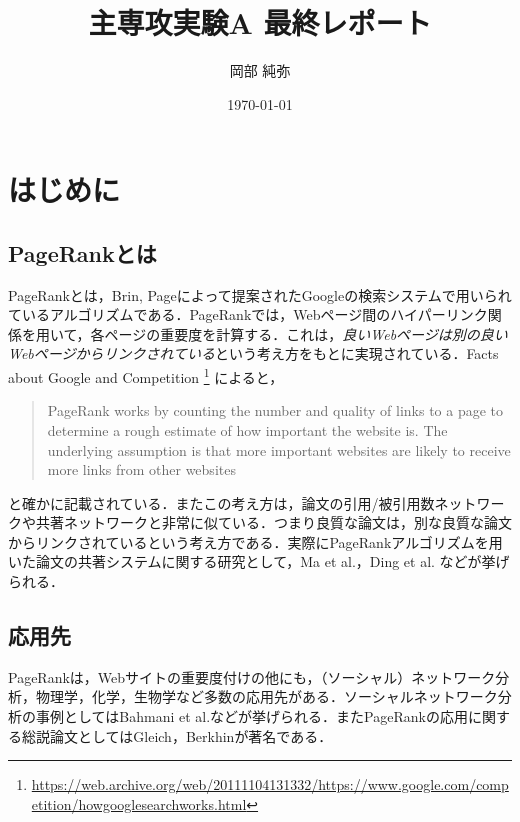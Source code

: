 \documentclass[a4j, dvipdfmx, twocolumn]{jsarticle}
\title{主専攻実験A 最終レポート}
\author{岡部 純弥}
\date{\today}
\begin{document}

\section{はじめに}
\subsection{PageRankとは}
PageRankとは，Brin, Page\cite{ilprints361}によって提案されたGoogleの検索システムで用いられているアルゴリズムである．PageRankでは，Webページ間のハイパーリンク関係を用いて，各ページの重要度を計算する．これは，\emph{良いWebページは別の良いWebページからリンクされている}という考え方をもとに実現されている．Facts about Google and Competition
\footnote{\url{https://web.archive.org/web/20111104131332/https://www.google.com/competition/howgooglesearchworks.html}}
によると，
\begin{quote}
  PageRank works by counting the number and quality of links to a page to determine a rough estimate of how important the website is. The underlying assumption is that more important websites are likely to receive more links from other websites
\end{quote}
と確かに記載されている．またこの考え方は，論文の引用/被引用数ネットワークや共著ネットワークと非常に似ている．つまり良質な論文は，別な良質な論文からリンクされているという考え方である．実際にPageRankアルゴリズムを用いた論文の共著システムに関する研究として，Ma et al.\cite{ma2008bringing}，Ding et al.\cite{ding2009pagerank} などが挙げられる．

\subsection{応用先}
PageRankは，Webサイトの重要度付けの他にも，（ソーシャル）ネットワーク分析，物理学，化学，生物学など多数の応用先がある．ソーシャルネットワーク分析の事例としてはBahmani et al.\cite{bahmani2010fast}などが挙げられる．またPageRankの応用に関する総説論文としてはGleich\cite{gleich2015pagerank}，Berkhin\cite{berkhin2005survey}が著名である．
\end{document}
